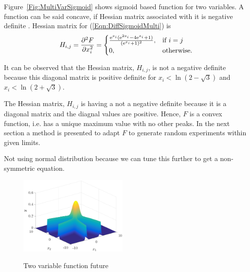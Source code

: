 \documentclass[twocolumn]{svjour3}          %
\newcommand{\me}{\mathrm{e}}
\begin{document}
Figure~\ref{Fig:MultiVarSigmoid} shows sigmoid based function for two variables. A function can be said concave, if Hessian matrix associated with it is negative definite \cite{bernstein1962some}. Hessian matrix for (\ref{Eqn:DiffSigmoidMulti}) is 
\begin{eqnarray}
H_{i,j} = \pdv[2]{F}{x_i} =
\begin{cases}
\frac{\me^{x_i}(\me^{2x_i}-4\me^{x_i}+1)}{(\me^{x_i}+1)^2},& \text{if } i = j\\
0,              & \text{otherwise.}
\end{cases} \label{Eqn:HessianMatrix}
\end{eqnarray}
\par
It can be observed that the Hessian matrix, $H_{i,j}$, is not a negative definite because this diagonal matrix is positive definite for $x_i<\ln({2-\sqrt{3}})$ and $x_i<\ln({2+\sqrt{3}})$.
\par
The Hessian matrix, $H_{i,j}$ is having a not a negative definite because it is a diagonal matrix and the diagnal values are positive. Hence, $F$ is a convex function, i.e. has a unique maximum value with no other peaks. In the next section a method is presented to adapt $F$ to generate random experiments within given limits.
\par
Not using normal distribution because we can tune this further to get a non-symmetric equation.
\begin{figure}
	\centering
	\includegraphics[width=0.48\textwidth]{images/2FactorsSigmoidFuture}
	\label{Fig:TwoVarFutureFunc}
	\caption{Two variable function future}
\end{figure}
\end{document}
